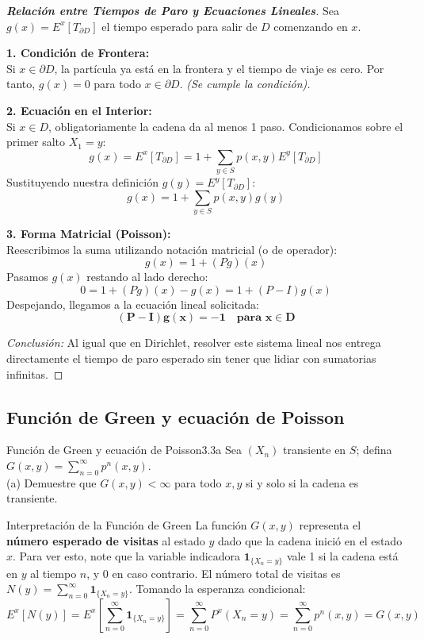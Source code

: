 \documentclass[10pt,a4paper]{article}
\begin{document}
\begin{proof}[\textbf{Relación entre Tiempos de Paro y Ecuaciones Lineales}]
    Sea $g(x) = E^x[T_{\partial D}]$ el tiempo esperado para salir de $D$ comenzando en $x$.
    
    \textbf{1. Condición de Frontera:} \\
    Si $x \in \partial D$, la partícula ya está en la frontera y el tiempo de viaje es cero.
    Por tanto, $g(x) = 0$ para todo $x \in \partial D$. \textit{(Se cumple la condición).}

    \textbf{2. Ecuación en el Interior:} \\
    Si $x \in D$, obligatoriamente la cadena da al menos 1 paso. Condicionamos sobre el primer salto $X_1 = y$:
    \[ g(x) = E^x[T_{\partial D}] = 1 + \sum_{y \in S} p(x,y) E^y[T_{\partial D}] \]
    Sustituyendo nuestra definición $g(y) = E^y[T_{\partial D}]$:
    \[ g(x) = 1 + \sum_{y \in S} p(x,y) g(y) \]
    
    \textbf{3. Forma Matricial (Poisson):} \\
    Reescribimos la suma utilizando notación matricial (o de operador):
    \[ g(x) = 1 + (Pg)(x) \]
    Pasamos $g(x)$ restando al lado derecho:
    \[ 0 = 1 + (Pg)(x) - g(x) = 1 + (P - I)g(x) \]
    Despejando, llegamos a la ecuación lineal solicitada:
    \[ \mathbf{(P - I)g(x) = -1 \quad \text{para } x \in D} \]
    
    \textit{Conclusión:} Al igual que en Dirichlet, resolver este sistema lineal nos entrega directamente el tiempo de paro esperado sin tener que lidiar con sumatorias infinitas.
\end{proof}

\newpage
\subsection{Función de Green y ecuación de Poisson}


\begin{ejercicio}{Función de Green y ecuación de Poisson}{3.3a}
    Sea $(X_n)$ transiente en $S$; defina $G(x,y) = \sum_{n=0}^\infty p^n(x,y)$. \\
    (a) Demuestre que $G(x,y) < \infty$ para todo $x,y$ si y solo si la cadena es transiente.
\end{ejercicio}

\vspace{2mm}

\begin{nota}{Interpretación de la Función de Green}
    La función $G(x,y)$ representa el \textbf{número esperado de visitas} al estado $y$ dado que la cadena inició en el estado $x$. 
    Para ver esto, note que la variable indicadora $\mathbf{1}_{\{X_n = y\}}$ vale 1 si la cadena está en $y$ al tiempo $n$, y 0 en caso contrario. 
    El número total de visitas es $N(y) = \sum_{n=0}^\infty \mathbf{1}_{\{X_n = y\}}$. 
    Tomando la esperanza condicional:
    $$ E^x[N(y)] = E^x\left[ \sum_{n=0}^\infty \mathbf{1}_{\{X_n = y\}} \right] = \sum_{n=0}^\infty P^x(X_n = y) = \sum_{n=0}^\infty p^n(x,y) = G(x,y) $$
\end{nota}
\end{document}
